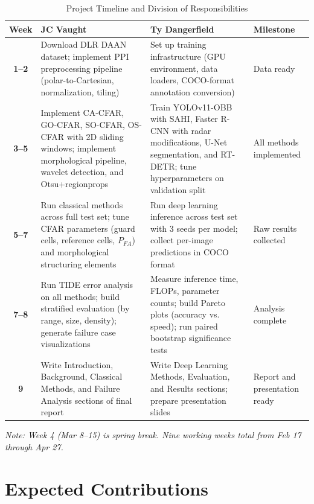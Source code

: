 \documentclass[conference]{IEEEtran}
\begin{document}
\begin{table}[t]
\centering
\caption{Project Timeline and Division of Responsibilities}
\vspace{0.3em}
\renewcommand{\arraystretch}{1.2}
\begin{tabular}{@{} >{\bfseries}c p{5.8cm} p{5.8cm} p{2.4cm} @{}}
\toprule
\rowcolor{USC_Black10} \textbf{Week} & \textbf{JC Vaught} & \textbf{Ty Dangerfield} & \textbf{Milestone} \\
\midrule
1--2 & Download DLR DAAN dataset; implement PPI preprocessing pipeline (polar-to-Cartesian, normalization, tiling) & Set up training infrastructure (GPU environment, data loaders, COCO-format annotation conversion) & Data ready \\
\rowcolor{USC_Black10}
3--5 & Implement CA-CFAR, GO-CFAR, SO-CFAR, OS-CFAR with 2D sliding windows; implement morphological pipeline, wavelet detection, and Otsu+regionprops & Train YOLOv11-OBB with SAHI, Faster R-CNN with radar modifications, U-Net segmentation, and RT-DETR; tune hyperparameters on validation split & All methods implemented \\
5--7 & Run classical methods across full test set; tune CFAR parameters (guard cells, reference cells, $P_{FA}$) and morphological structuring elements & Run deep learning inference across test set with 3 seeds per model; collect per-image predictions in COCO format & Raw results collected \\
\rowcolor{USC_Black10}
7--8 & Run TIDE error analysis on all methods; build stratified evaluation (by range, size, density); generate failure case visualizations & Measure inference time, FLOPs, parameter counts; build Pareto plots (accuracy vs. speed); run paired bootstrap significance tests & Analysis complete \\
9 & Write Introduction, Background, Classical Methods, and Failure Analysis sections of final report & Write Deep Learning Methods, Evaluation, and Results sections; prepare presentation slides & Report and presentation ready \\
\bottomrule
\end{tabular}
\vspace{0.3em}
\noindent\small\textit{Note: Week 4 (Mar 8--15) is spring break. Nine working weeks total from Feb 17 through Apr 27.}
\end{table}

\section{Expected Contributions}
\end{document}
